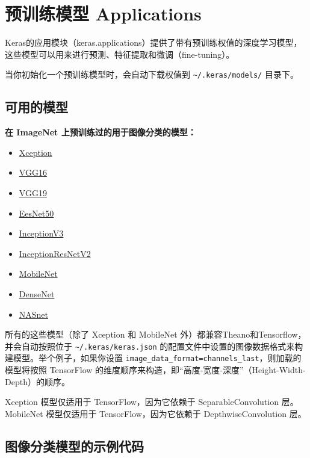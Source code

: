 
\section{预训练模型 Applications}\label{applications}

Keras的应用模块（keras.applications）提供了带有预训练权值的深度学习模型，这些模型可以用来进行预测、特征提取和微调（fine-tuning）。

当你初始化一个预训练模型时，会自动下载权值到
\texttt{\textasciitilde{}/.keras/models/} 目录下。

\subsection{可用的模型}\label{ux53efux7528ux7684ux6a21ux578b}

\textbf{在 ImageNet
上预训练过的用于图像分类的模型：}\label{ux5728-imagenet-ux4e0aux9884ux8badux7ec3ux8fc7ux7684ux7528ux4e8eux56feux50cfux5206ux7c7bux7684ux6a21ux578b}

\begin{itemize}
\tightlist
\item
  \hyperref[xception]{Xception}
\item
  \hyperref[vgg16]{VGG16}
\item
  \hyperref[vgg19]{VGG19}
\item
  \hyperref[resnet50]{EesNet50}
\item
  \hyperref[inceptionv3]{InceptionV3}
\item
  \hyperref[inceptionresnetv2]{InceptionResNetV2}
\item
  \hyperref[mobilenet]{MobileNet}
\item
  \hyperref[densenet]{DenseNet}
\item
  \hyperref[nasnet]{NASnet}
\end{itemize}

所有的这些模型（除了 Xception 和 MobileNet
外）都兼容Theano和Tensorflow，并会自动按照位于
\texttt{\textasciitilde{}/.keras/keras.json}
的配置文件中设置的图像数据格式来构建模型。举个例子，如果你设置
\texttt{image\_data\_format=channels\_last}，则加载的模型将按照
TensorFlow
的维度顺序来构造，即``高度-宽度-深度''（Height-Width-Depth）的顺序。

Xception 模型仅适用于 TensorFlow，因为它依赖于 SeparableConvolution
层。MobileNet 模型仅适用于 TensorFlow，因为它依赖于 DepthwiseConvolution
层。



\subsection{图像分类模型的示例代码}\label{ux56feux50cfux5206ux7c7bux6a21ux578bux7684ux793aux4f8bux4ee3ux7801}

